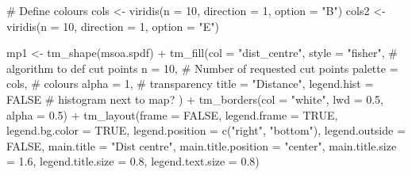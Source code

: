 \documentclass[
  letterpaper,
]{scrbook}
\newenvironment{Shaded}{\begin{snugshade}}{\end{snugshade}}
\newcommand{\AttributeTok}[1]{\textcolor[rgb]{0.40,0.45,0.13}{#1}}
\newcommand{\CommentTok}[1]{\textcolor[rgb]{0.37,0.37,0.37}{#1}}
\newcommand{\ConstantTok}[1]{\textcolor[rgb]{0.56,0.35,0.01}{#1}}
\newcommand{\DecValTok}[1]{\textcolor[rgb]{0.68,0.00,0.00}{#1}}
\newcommand{\FloatTok}[1]{\textcolor[rgb]{0.68,0.00,0.00}{#1}}
\newcommand{\FunctionTok}[1]{\textcolor[rgb]{0.28,0.35,0.67}{#1}}
\newcommand{\NormalTok}[1]{\textcolor[rgb]{0.00,0.23,0.31}{#1}}
\newcommand{\OtherTok}[1]{\textcolor[rgb]{0.00,0.23,0.31}{#1}}
\newcommand{\SpecialCharTok}[1]{\textcolor[rgb]{0.37,0.37,0.37}{#1}}
\newcommand{\StringTok}[1]{\textcolor[rgb]{0.13,0.47,0.30}{#1}}
\begin{document}
\begin{Shaded}
\begin{Highlighting}[]
\CommentTok{\# Define colours}
\NormalTok{cols }\OtherTok{\textless{}{-}} \FunctionTok{viridis}\NormalTok{(}\AttributeTok{n =} \DecValTok{10}\NormalTok{, }\AttributeTok{direction =} \DecValTok{1}\NormalTok{, }\AttributeTok{option =} \StringTok{"B"}\NormalTok{)}
\NormalTok{cols2 }\OtherTok{\textless{}{-}} \FunctionTok{viridis}\NormalTok{(}\AttributeTok{n =} \DecValTok{10}\NormalTok{, }\AttributeTok{direction =} \DecValTok{1}\NormalTok{, }\AttributeTok{option =} \StringTok{"E"}\NormalTok{)}


\NormalTok{mp1 }\OtherTok{\textless{}{-}}  \FunctionTok{tm\_shape}\NormalTok{(msoa.spdf) }\SpecialCharTok{+} 
  \FunctionTok{tm\_fill}\NormalTok{(}\AttributeTok{col =} \StringTok{"dist\_centre"}\NormalTok{, }
          \AttributeTok{style =} \StringTok{"fisher"}\NormalTok{, }\CommentTok{\# algorithm to def cut points}
          \AttributeTok{n =} \DecValTok{10}\NormalTok{, }\CommentTok{\# Number of requested cut points}
          \AttributeTok{palette =}\NormalTok{ cols, }\CommentTok{\# colours}
          \AttributeTok{alpha =} \DecValTok{1}\NormalTok{, }\CommentTok{\# transparency }
          \AttributeTok{title =} \StringTok{"Distance"}\NormalTok{, }
          \AttributeTok{legend.hist =} \ConstantTok{FALSE} \CommentTok{\# histogram next to map?}
\NormalTok{          ) }\SpecialCharTok{+}
  \FunctionTok{tm\_borders}\NormalTok{(}\AttributeTok{col =} \StringTok{"white"}\NormalTok{, }\AttributeTok{lwd =} \FloatTok{0.5}\NormalTok{, }\AttributeTok{alpha =} \FloatTok{0.5}\NormalTok{) }\SpecialCharTok{+}
  \FunctionTok{tm\_layout}\NormalTok{(}\AttributeTok{frame =} \ConstantTok{FALSE}\NormalTok{,}
            \AttributeTok{legend.frame =} \ConstantTok{TRUE}\NormalTok{, }\AttributeTok{legend.bg.color =} \ConstantTok{TRUE}\NormalTok{,}
            \AttributeTok{legend.position =} \FunctionTok{c}\NormalTok{(}\StringTok{"right"}\NormalTok{, }\StringTok{"bottom"}\NormalTok{),}
            \AttributeTok{legend.outside =} \ConstantTok{FALSE}\NormalTok{,}
            \AttributeTok{main.title =} \StringTok{"Dist centre"}\NormalTok{, }
            \AttributeTok{main.title.position =} \StringTok{"center"}\NormalTok{,}
            \AttributeTok{main.title.size =} \FloatTok{1.6}\NormalTok{,}
            \AttributeTok{legend.title.size =} \FloatTok{0.8}\NormalTok{,}
            \AttributeTok{legend.text.size =} \FloatTok{0.8}\NormalTok{)}



\end{Highlighting}
\end{Shaded}
\end{document}
